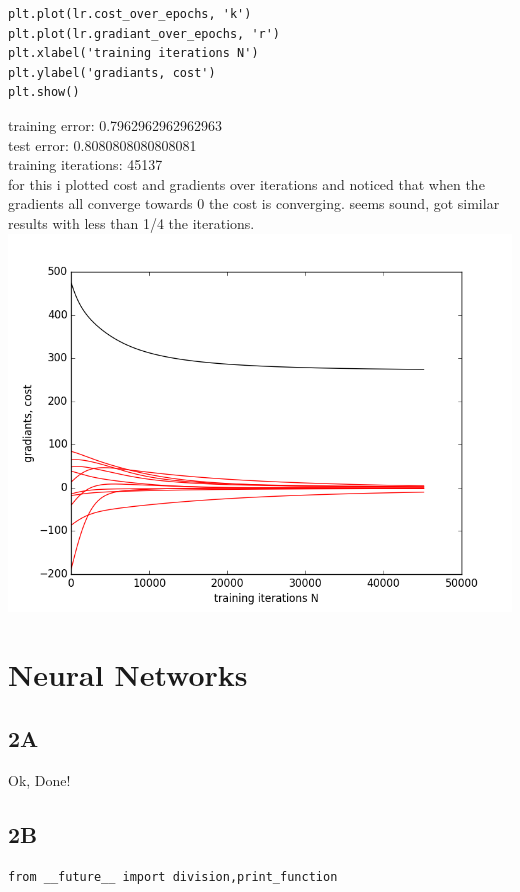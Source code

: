 \documentclass[12pt]{article}
\begin{document}
\begin{flushleft}
\begin{lstlisting}
plt.plot(lr.cost_over_epochs, 'k')
plt.plot(lr.gradiant_over_epochs, 'r')
plt.xlabel('training iterations N')
plt.ylabel('gradiants, cost')
plt.show()

		\end{lstlisting}
		
		
		training error: 0.7962962962962963\\
		test error: 0.8080808080808081\\
		training iterations: 45137\\
		
		for this i plotted cost and gradients over iterations and noticed that when the gradients all converge towards 0 the cost is converging. seems sound, got similar results with less than 1/4 the iterations.\\
		
		\includegraphics[scale=0.5]{HW2_1C.png}
		\label{fig:graph 1C}

		
		\section{Neural Networks}
		
		\subsection*{2A}
		Ok, Done!\\
		
		\subsection*{2B}
		\begin{lstlisting}
from __future__ import division,print_function


\end{lstlisting}
\end{flushleft}
\end{document}
